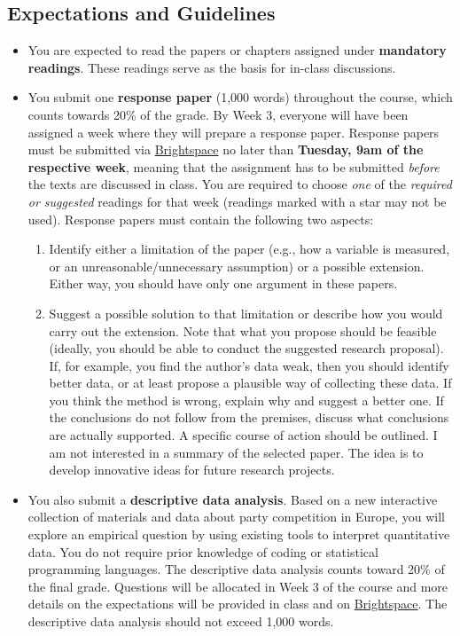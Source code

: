 \documentclass[abstract=on,parskip=full,headings=standardclasses,fontsize=11pt,paper=a4]{scrartcl}
\begin{document}
\subsection*{Expectations and Guidelines}
\begin{itemize}


\item You are expected to read the papers or chapters assigned under \textbf{mandatory readings}. These readings serve as the basis for in-class discussions.%

\item You submit one \textbf{response paper} (1,000 words) throughout the course, which counts towards 20\% of the grade. By Week 3, everyone will have been assigned a week where they will prepare a response paper. Response papers must be submitted via \href{https://brightspace.ucd.ie/}{Brightspace} no later than \textbf{Tuesday, 9am of the respective week}, meaning that the assignment has to be submitted \textit{before} the texts are discussed in class. You are required to choose \textit{one} of the \textit{required or suggested} readings for that week (readings marked with a star may not be used).  Response papers must contain the following two aspects:
\begin{enumerate}
\item Identify either a limitation of the paper (e.g., how a variable is measured, or an unreasonable/unnecessary assumption) or a possible extension. Either way, you should have only one argument in these papers. 
\item Suggest a possible solution to that limitation or describe how you would carry out the extension. Note that what you propose should be feasible (ideally, you should be able to conduct the suggested research proposal). If, for example, you find the author's data weak, then you should identify better data, or at least propose a plausible way of collecting these data. If you think the method is wrong, explain why and suggest a better one. If the conclusions do not follow from the premises, discuss what conclusions are actually supported. A specific course of action should be outlined. I am not interested in a summary of the selected paper. The idea is to develop innovative ideas for future research projects. 
\end{enumerate}

\item You also submit a \textbf{descriptive data analysis}. Based on a new interactive collection of materials and data about party competition in Europe, you will explore an empirical question by using existing tools to interpret quantitative data. You do not require prior knowledge of coding or statistical programming languages. The descriptive data analysis counts toward 20\% of the final grade. Questions will be allocated in Week 3 of the course and more details on the expectations will be provided in class and on \href{https://brightspace.ucd.ie}{Brightspace}. The descriptive data analysis should not exceed 1,000 words.


\end{itemize}
\end{document}
